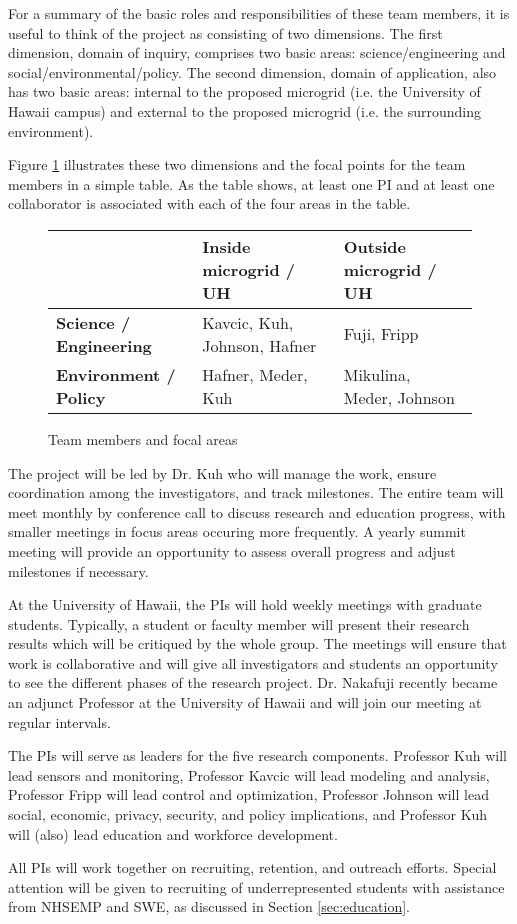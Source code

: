 For a summary of the basic roles and responsibilities of these team
members, it is useful to think of the project as consisting of two
dimensions.  The first dimension, domain of inquiry, comprises two basic
areas: science/engineering and social/environmental/policy.  The second
dimension, domain of application, also has two basic areas: internal to the
proposed microgrid (i.e. the University of Hawaii campus) and external to
the proposed microgrid (i.e. the surrounding environment).

Figure \ref{fig:team}
illustrates these two dimensions and the focal points for the team
members in a simple table.  As the table shows, at least one PI and at
least one collaborator is associated with each of the four areas in the
table. 


\begin{figure}
\begin{tabular}{|p{1.8in}|p{2.0in}|p{1.8in}|}
\hline
& {\bf Inside microgrid / UH} & {\bf Outside microgrid / UH}  \\ \hline
{\bf Science / Engineering} & Kavcic, Kuh, Johnson, Hafner & Fuji, Fripp \\ \hline
{\bf Environment / Policy} & Hafner, Meder, Kuh & Mikulina, Meder, Johnson \\ \hline
\end{tabular} 
\caption{Team members and focal areas}
\label{fig:team}
\end{figure}


The project will be led by Dr. Kuh who will manage the work, ensure
coordination among the investigators, and track milestones. The entire team
will meet monthly by conference call to discuss research and education
progress, with smaller meetings in focus areas occuring more frequently.  A
yearly summit meeting will provide an opportunity to assess overall
progress and adjust milestones if necessary.

At the University of Hawaii, the PIs will hold weekly meetings
with graduate students.  Typically, a student or faculty member will
present their research results which will be critiqued by the whole group.
The meetings will ensure that work is collaborative and will give all
investigators and students an opportunity to see the different phases of
the research project.  Dr. Nakafuji recently became an adjunct Professor at
the University of Hawaii and will join our meeting at regular intervals.

The PIs will serve as leaders for the five research components. Professor
Kuh will lead sensors and monitoring, Professor Kavcic will lead
modeling and analysis, Professor Fripp will lead control and optimization,
Professor Johnson will lead social, economic, privacy, security, and policy
implications, and Professor Kuh will (also) lead education and workforce
development. 

All PIs will work together on recruiting, retention, and outreach
efforts.  Special attention will be given to recruiting of underrepresented
students with assistance from NHSEMP and SWE, as discussed in Section \ref{sec:education}.
 

